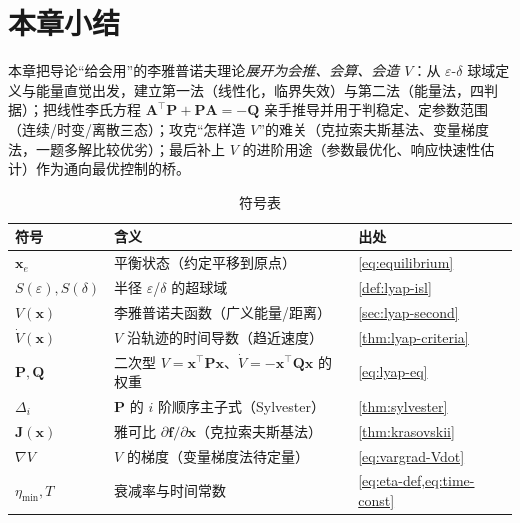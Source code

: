 \section*{本章小结}
\label{sec:lyap-summary}

本章把导论“给会用”的李雅普诺夫理论\emph{展开为会推、会算、会造 $V$}：从 $\varepsilon$-$\delta$ 球域定义与能量直觉出发，建立第一法（线性化，临界失效）与第二法（能量法，四判据）；把线性李氏方程 $\mathbf{A}^\top\mathbf{P}+\mathbf{P}\mathbf{A}=-\mathbf{Q}$ 亲手推导并用于判稳定、定参数范围（连续/时变/离散三态）；攻克“怎样造 $V$”的难关（克拉索夫斯基法、变量梯度法，一题多解比较优劣）；最后补上 $V$ 的进阶用途（参数最优化、响应快速性估计）作为通向最优控制的桥。

\begin{table}[H]\centering\small
\caption{符号表}
\begin{tabular}{lll}
\toprule
符号 & 含义 & 出处 \\
\midrule
$\mathbf{x}_e$ & 平衡状态（约定平移到原点） & \cref{eq:equilibrium} \\
$S(\varepsilon),S(\delta)$ & 半径 $\varepsilon$/$\delta$ 的超球域 & \cref{def:lyap-isl} \\
$V(\mathbf{x})$ & 李雅普诺夫函数（广义能量/距离） & \cref{sec:lyap-second} \\
$\dot V(\mathbf{x})$ & $V$ 沿轨迹的时间导数（趋近速度） & \cref{thm:lyap-criteria} \\
$\mathbf{P},\mathbf{Q}$ & 二次型 $V=\mathbf{x}^\top\mathbf{P}\mathbf{x}$、$\dot V=-\mathbf{x}^\top\mathbf{Q}\mathbf{x}$ 的权重 & \cref{eq:lyap-eq} \\
$\Delta_i$ & $\mathbf{P}$ 的 $i$ 阶顺序主子式（Sylvester） & \cref{thm:sylvester} \\
$\mathbf{J}(\mathbf{x})$ & 雅可比 $\partial\mathbf{f}/\partial\mathbf{x}$（克拉索夫斯基法） & \cref{thm:krasovskii} \\
$\nabla V$ & $V$ 的梯度（变量梯度法待定量） & \cref{eq:vargrad-Vdot} \\
$\eta_{\min},T$ & 衰减率与时间常数 & \cref{eq:eta-def,eq:time-const} \\
\bottomrule
\end{tabular}
\end{table}

